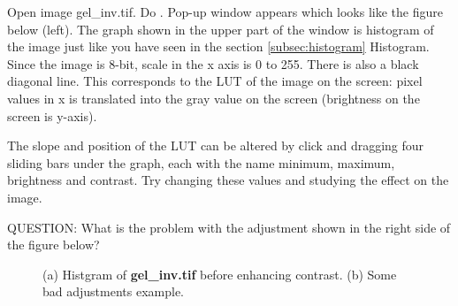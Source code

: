\begin{indentexercise}{1}
Open image gel\_inv.tif. Do . 
Pop-up window appears which looks like the
figure below (left). The graph shown in the upper part of the window is
histogram of the image just like you have seen in the section \ref{subsec:histogram} Histogram. 
Since the image is 8-bit, scale in the x axis is 0 to 255.
There is also a black diagonal line. This corresponds to the LUT of the
image on the screen: pixel values in x is translated into the gray
value on the screen (brightness on the screen is y-axis). 

The slope and position of the LUT can be altered by click and dragging
four sliding bars under the graph, each with the name minimum, maximum,
brightness and contrast. Try changing these values and studying the
effect on the image. 

QUESTION: What is the problem with the adjustment shown in the
right side of the figure below?

\begin{figure}[htbp]
 \centering
 \caption{ (a) Histgram of \textbf{gel\_inv.tif} before enhancing contrast. (b) Some bad adjustments example. }
 \label{fig:quizEnhanceContrast}
\end{figure} 

\end{indentexercise}

